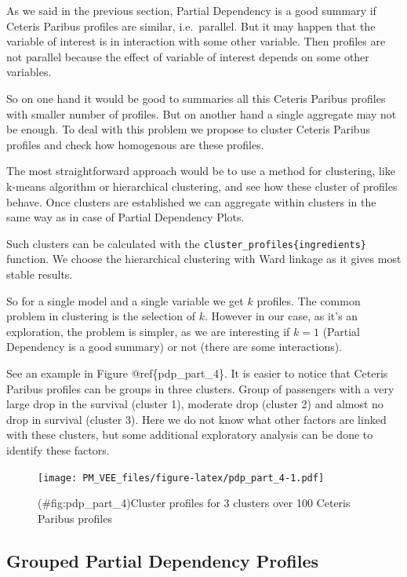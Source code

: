 \documentclass[12pt,]{krantz}
\theoremstyle{definition}
\theoremstyle{definition}
\theoremstyle{definition}
\theoremstyle{remark}
\begin{document}
As we said in the previous section, Partial Dependency is a good summary
if Ceteris Paribus profiles are similar, i.e.~parallel. But it may
happen that the variable of interest is in interaction with some other
variable. Then profiles are not parallel because the effect of variable
of interest depends on some other variables.

So on one hand it would be good to summaries all this Ceteris Paribus
profiles with smaller number of profiles. But on another hand a single
aggregate may not be enough. To deal with this problem we propose to
cluster Ceteris Paribus profiles and check how homogenous are these
profiles.

The most straightforward approach would be to use a method for
clustering, like k-means algorithm or hierarchical clustering, and see
how these cluster of profiles behave. Once clusters are established we
can aggregate within clusters in the same way as in case of Partial
Dependency Plots.

Such clusters can be calculated with the
\texttt{cluster\_profiles\{ingredients\}} function. We choose the
hierarchical clustering with Ward linkage as it gives most stable
results.

So for a single model and a single variable we get \(k\) profiles. The
common problem in clustering is the selection of \(k\). However in our
case, as it's an exploration, the problem is simpler, as we are
interesting if \(k=1\) (Partial Dependency is a good summary) or not
(there are some interactions).

See an example in Figure @ref\{pdp\_part\_4\}. It is easier to notice
that Ceteris Paribus profiles can be groups in three clusters. Group of
passengers with a very large drop in the survival (cluster 1), moderate
drop (cluster 2) and almost no drop in survival (cluster 3). Here we do
not know what other factors are linked with these clusters, but some
additional exploratory analysis can be done to identify these factors.

\begin{figure}
\centering
\texttt{[image: PM\_VEE\_files/figure-latex/pdp\_part\_4-1.pdf]}
\caption{(\#fig:pdp\_part\_4)Cluster profiles for 3 clusters over 100
Ceteris Paribus profiles}
\end{figure}

\hypertarget{grouped-partial-dependency-profiles}{%
\subsection{Grouped Partial Dependency
Profiles}\label{grouped-partial-dependency-profiles}}
\end{document}
